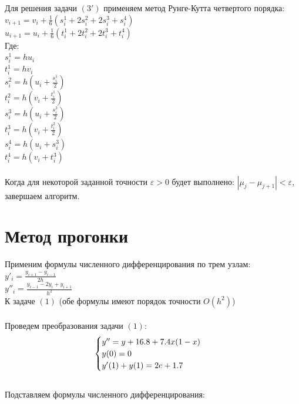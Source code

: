 \documentclass[12pt,a4paper]{article}
\begin{document}
		\noindent
		Для решения задачи $(3')$ применяем метод Рунге-Кутта четвертого порядка:\\
		$v_{i+1} = v_{i} + \frac{1}{6}(s_{i}^{1} +2s_{i}^{2} + 2s_{i}^3 + s_{i}^4)$\\
        $u_{i+1} = u_{i} + \frac{1}{6}(t_{i}^{1} +2t_{i}^{2} + 2t_{i}^3 + t_{i}^4)$\\
        Где:\\
        $s_{i}^{1} = hu_{i}$\\
        $t_{i}^{1} = hv_{i}$\\
        $s_{i}^{2} = h(u_{i} + \frac{s_{i}^{1}}{2})$\\
        $t_{i}^{2} = h(v_{i} + \frac{t_{i}^{1}}{2})$\\
        $s_{i}^{3} = h(u_{i} + \frac{s_{i}^{2}}{2})$\\
        $t_{i}^{3} = h(v_{i} + \frac{t_{i}^{2}}{2})$\\
        $s_{i}^{4} = h(u_{i} + s_{i}^{3})$\\
        $t_{i}^{4} = h(v_{i} + t_{i}^{3})$\\\\
        
        \noindent
        Когда для некоторой заданной точности $\varepsilon > 0$ будет выполнено:
        $|\mu_{j} - \mu_{j+1}| < \varepsilon$, завершаем алгоритм.
        
    \newpage
	\section*{Метод прогонки}
		Применим формулы численного дифференцирования по трем узлам:\\
		$y'_{i} = \frac{y_{i+1} - y_{i-1}}{2h}$\\
		$y''_{i} = \frac{y_{i-1} - 2y_{i} + y_{i+1}}{h^{2}}$\\
		К задаче $(1)$
		(обе формулы имеют порядок точности $O(h^{2})$)\\\\
		
		\noindent
		Проведем преобразования задачи $(1)$:\\
		\[
		\begin{cases}
			y'' = y + 16.8 + 7.4x(1-x)\\
			y(0) = 0\\
			y'(1) + y(1) = 2e + 1.7
		\end{cases}\\
		\]\\
		Подставляем формулы численного дифференцирования:\\
		
\end{document}
